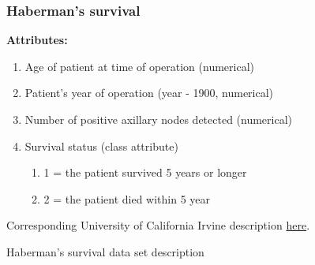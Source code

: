 \documentclass[a4paper,12pt, oneside]{memoir}
\begin{document}
\begin{figure}[h]
  \centering
  \begin{minipage}[h]{1.0\textwidth}
    \subsubsection{Haberman's survival}
    \textbf{Attributes:}
    \begin{enumerate}
      \setlength\itemsep{0.001em}
      \item Age of patient at time of operation (numerical)
      \item Patient's year of operation (year - 1900, numerical) 
      \item Number of positive axillary nodes detected (numerical) 
      \item Survival status (class attribute) 
        \begin{enumerate}
          \item 1 = the patient survived 5 years or longer
          \item 2 = the patient died within 5 year
        \end{enumerate}
    \end{enumerate}

    Corresponding University of California Irvine description \href{https://archive.ics.uci.edu/ml/datasets/Haberman\%27s+Survival}{here}. \cite{uci-machine-learning-repo-2013}    
  \end{minipage}
  \hfill
  \begin{minipage}[h]{0.0\textwidth}
  \end{minipage}
  \caption{ Haberman's survival data set description}
  \label{ haberman-data set-description}
\end{figure}
\end{document}
